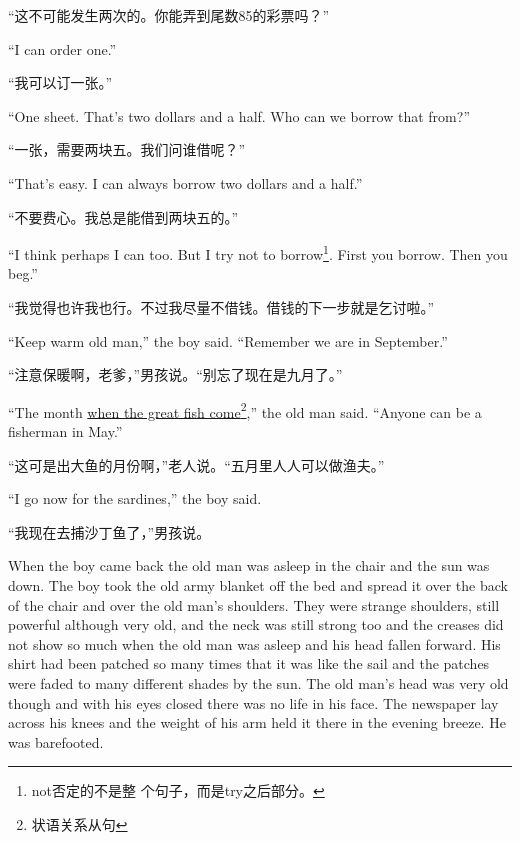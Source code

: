 \begin{paracol}{2}
\switchcolumn

“这不可能发生两次的。你能弄到尾数85的彩票吗？”

\switchcolumn*

``I can \gls{order} one.''

\switchcolumn

“我可以订一张。”

\switchcolumn*

``One sheet. That's two dollars and a half. Who can we borrow that from?''

\switchcolumn

“一张，需要两块五。我们问谁借呢？”

\switchcolumn*

``That's easy. I can always borrow two dollars and a half.''

\switchcolumn

“不要费心。我总是能借到两块五的。”

\switchcolumn*

``I think perhaps I can too. But I try not to borrow\footnote{not否定的不是整
  个句子，而是try之后部分。}. First you borrow. Then you beg.''

\switchcolumn

“我觉得也许我也行。不过我尽量不借钱。借钱的下一步就是乞讨啦。”

\switchcolumn*

``Keep warm old man,'' the boy said. ``Remember we are in September.''

\switchcolumn

“注意保暖啊，老爹，”男孩说。“别忘了现在是九月了。”

\switchcolumn*

``The month \uline{when the great fish come}\footnote{状语关系从句},'' the old
man said. ``Anyone can be a fisherman in May.''

\switchcolumn

“这可是出大鱼的月份啊，”老人说。“五月里人人可以做渔夫。”

\switchcolumn*

``I go now for the sardines,'' the boy said.

\switchcolumn

“我现在去捕沙丁鱼了，”男孩说。

\switchcolumn*

When the boy came back the old man was \gls{asleep} in the chair and the sun was
down. The boy took the old army \gls{blanket} off the bed and \gls{spread}
it over the back of the chair and over the old man's shoulders. They were
strange shoulders, still powerful although very old, and the neck was still
strong too and the \glspl{crease} did not show so much when the old man was
asleep and his head fallen forward. His shirt had been \gls{patched} so many
times that it was like the sail and the patches were \gls{faded} to many
different \glspl{shade} by the sun. The old man's head was very old though
and with his eyes closed there was no life in his face. The newspaper
\gls{lay} across his \glspl{knee} and the weight of his arm held it there in
the evening breeze. He was \gls{barefooted}.


\end{paracol}
